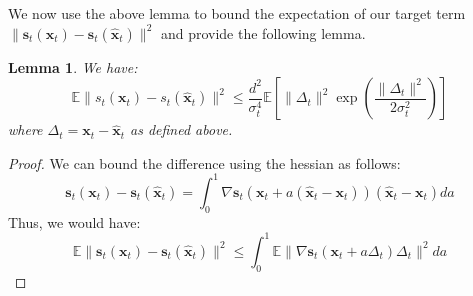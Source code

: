\documentclass[11pt]{article}
\def\rvx{{\mathbf{x}}}
\def\vs{{\bm{s}}}
\def\vx{{\bm{x}}}
\newtheorem{lemma}{Lemma}[section]
\begin{document}
\noindent
We now use the above lemma to bound the expectation of our target term $\|\vs_t(\rvx_t)-{\vs}_t(\hat{\rvx}_t)\|^2$ and provide the following lemma.

\begin{lemma}
\label{expected_smooth}
 We have:
 \begin{equation}
     \mathbb{E}\|s_t(\rvx_t)-s_t(\hat{\rvx}_t)\|^2 \leq \frac{d^2}{\sigma_t^4}\mathbb{E}\left[ \|\Delta_t\|^2\exp\left(\frac{\|\Delta_t\|^2}{2\sigma_t^2}\right) \right]
 \end{equation}
 where $\Delta_t = \rvx_t-\hat{\rvx}_t$ as defined above.
\end{lemma}
\begin{proof}
    We can bound the difference using the hessian as follows:
    \[
        \vs_t(\vx_t) - {\vs}_t(\hat{\vx}_t) = \int_{0}^1 \nabla \vs_t(\vx_t+a(\hat{\vx}_t-\vx_t))(\hat{\vx}_t-\vx_t)da
    \]
    Thus, we would have:
    \[
   \mathbb{E} \|\vs_t(\rvx_t)-\vs_t(\hat{\rvx}_t)\|^2 \leq \int_{0}^1 \mathbb{E}\|\nabla \vs_t(\rvx_t+a\Delta_t)\Delta_t\|^2da
    \]



\end{proof}
\end{document}
